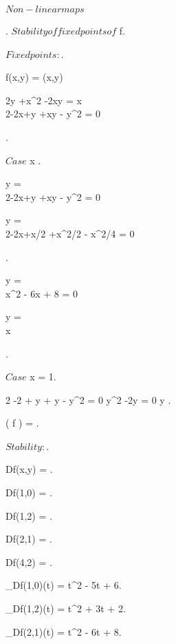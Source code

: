 \documentclass[../Main/main]{subfiles}
\begin{document}
\unit{ $ Non-linear maps $ }
{
	\laboratory{}
	
	\thread{ $  $ }
	{
		{
			.
		}
		\study	
		{
			$Stability of fixed points of $ f.
		}
		\demonstration
		{
			$Fixed points:$.

			f(x,y) = (x,y) \ifandonlyif \begin{cases} 2y +x^2 -2xy = x \\ 2-2x+y +xy - y^2 = 0 \end{cases}.

			$Case $ x .

			\ifandonlyif \begin{cases} y =  \\ 2-2x+y +xy - y^2 = 0 \end{cases}

			\ifandonlyif \begin{cases} y =  \\ 2-2x+x/2 +x^2/2 - x^2/4 = 0 \end{cases}.

			\ifandonlyif \begin{cases} y =  \\ x^2 - 6x + 8 = 0 \end{cases}

			\ifandonlyif \begin{cases} y =  \\ x \in {} \end{cases}.

			$Case $ x = 1.

			2 -2 + y + y - y^2 = 0 \ifandonlyif y^2 -2y = 0 \ifandonlyif y \in {}.

			\fixed( f ) = .

			$Stability:$.

			Df(x,y) = .

			Df(1,0) = .

			Df(1,2) = .

			Df(2,1) = .

			Df(4,2) = .

			\chi_{Df(1,0)}(t) = t^2 - 5t + 6.

			\chi_{Df(1,2)}(t) = t^2 + 3t + 2.

			\chi_{Df(2,1)}(t) = t^2 - 6t + 8.

}}}
\end{document}
